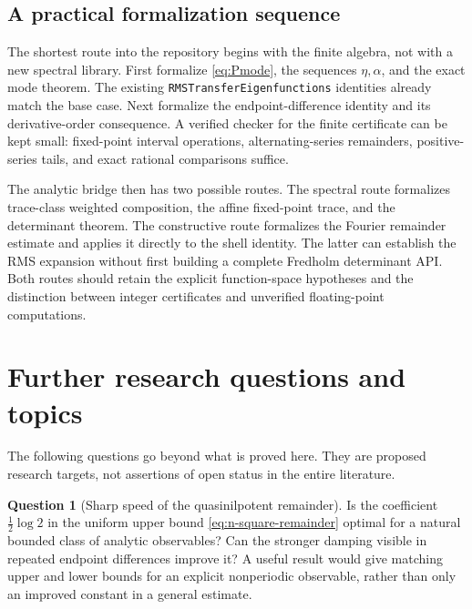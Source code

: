 \documentclass[11pt,a4paper]{article}
\theoremstyle{definition}
\newtheorem{question}[theorem]{Question}
\theoremstyle{remark}
\numberwithin{equation}{section}
\begin{document}
\subsection{A practical formalization sequence}
The shortest route into the repository begins with the finite algebra, not
with a new spectral library. First formalize \cref{eq:Pmode}, the sequences
$\eta,\alpha$, and the exact mode theorem. The existing
\texttt{RMSTransferEigenfunctions} identities already match the base case.
Next formalize the endpoint-difference identity and its derivative-order
consequence. A verified checker for the finite certificate can be kept
small: fixed-point interval operations, alternating-series remainders,
positive-series tails, and exact rational comparisons suffice.

The analytic bridge then has two possible routes. The spectral route
formalizes trace-class weighted composition, the affine fixed-point trace,
and the determinant theorem. The constructive route formalizes the Fourier
remainder estimate and applies it directly to the shell identity. The latter
can establish the RMS expansion without first building a complete Fredholm
determinant API. Both routes should retain the explicit function-space
hypotheses and the distinction between integer certificates and unverified
floating-point computations.

\section{Further research questions and topics}
\label{sec:questions}
The following questions go beyond what is proved here. They are proposed
research targets, not assertions of open status in the entire literature.

\begin{question}[Sharp speed of the quasinilpotent remainder]
Is the coefficient $\tfrac12\log2$ in the uniform upper bound
\cref{eq:n-square-remainder} optimal for a natural bounded class of analytic
observables? Can the stronger damping visible in repeated endpoint
differences improve it? A useful result would give matching upper and lower
bounds for an explicit nonperiodic observable, rather than only an improved
constant in a general estimate.
\end{question}
\end{document}
